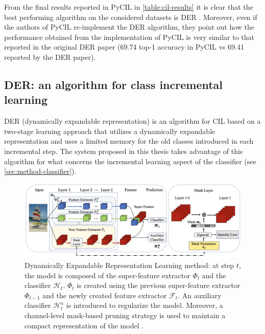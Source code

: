 From the final results reported in PyCIL in \autoref{table:cil-results} it is clear that the best performing algorithm on the considered datasets is DER \cite{yan2021dynamically}. Moreover, even if the authors of PyCIL re-implement the DER algorithm, they point out how the performance obtained from the implementation of PyCIL is very similar to that reported in the original DER paper (69.74 top-1 accuracy in PyCIL vs 69.41 reported by the DER paper).


\subsection{DER: an algorithm for class incremental learning}
\label{sec:der-algorithm}
DER (dynamically expandable representation) is an algorithm for CIL based on a two-stage learning approach that utilizes a dynamically expandable representation and uses a limited memory for the old classes introduced in each incremental step. The system proposed in this thesis takes advantage of this algorithm for what concerns the incremental learning aspect of the classifier (see \autoref{sec:method-classifier}).


\begin{figure}%
	\centering

    \begin{center}
        \includegraphics[width=\columnwidth]{images/der-pipeline.png}
    \end{center}

	\caption{Dynamically Expandable Representation Learning method: at step $t$, the model is composed of the super-feature extractor $\Phi_t$ and the classifier $\mathcal{H}_t$. $\Phi_t$ is created using the previous super-feature extractor $\Phi_{t-1}$ and the newly created feature extractor $\mathcal{F}_t$. An auxiliary classifier $\mathcal{H}_t^a$ is introduced to regularize the model. Moreover, a channel-level
    mask-based pruning strategy is used to maintain a compact representation of the model \cite{yan2021dynamically}.}%
	\label{fig:der-pipeline}%
\end{figure}


